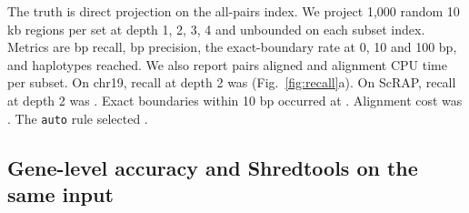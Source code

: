 The truth is direct projection on the all-pairs index.
We project 1,000 random 10 kb regions per set at depth 1, 2, 3, 4 and unbounded on each subset index.
Metrics are bp recall, bp precision, the exact-boundary rate at 0, 10 and 100 bp, and haplotypes reached.
We also report pairs aligned and alignment CPU time per subset.
On chr19, recall at depth 2 was  (Fig.~\ref{fig:recall}a).
On ScRAP, recall at depth 2 was .
Exact boundaries within 10 bp occurred at .
Alignment cost was .
The \texttt{auto} rule selected .

\subsection{Gene-level accuracy and Shredtools on the same input}
\label{sec:res-genes}

